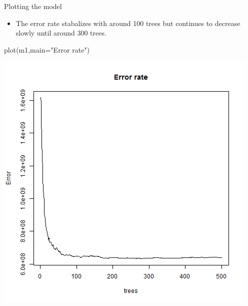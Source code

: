 \documentclass[
  10pt,
  ignorenonframetext,
]{beamer}
\newenvironment{Shaded}{}{}
\newcommand{\DataTypeTok}[1]{#1}
\newcommand{\KeywordTok}[1]{\textcolor[rgb]{0.00,0.00,1.00}{#1}}
\newcommand{\NormalTok}[1]{#1}
\newcommand{\StringTok}[1]{\textcolor[rgb]{0.00,0.50,0.50}{#1}}
\providecommand{\tightlist}{%
  \setlength{\itemsep}{0pt}\setlength{\parskip}{0pt}}
\begin{document}
\begin{frame}[fragile]{Plotting the model}
\protect\hypertarget{plotting-the-model}{}

\begin{itemize}
\tightlist
\item
  The error rate stabalizes with around 100 trees but continues to
  decrease slowly until around 300 trees.
\end{itemize}

\begin{Shaded}
\begin{Highlighting}[]
\KeywordTok{plot}\NormalTok{(m1,}\DataTypeTok{main=}\StringTok{"Error rate"}\NormalTok{)}
\end{Highlighting}
\end{Shaded}

\includegraphics[width=\textwidth,height=0.65\textheight]{figure/ml_rf_errorrate_m1.png}

\end{frame}
\end{document}
